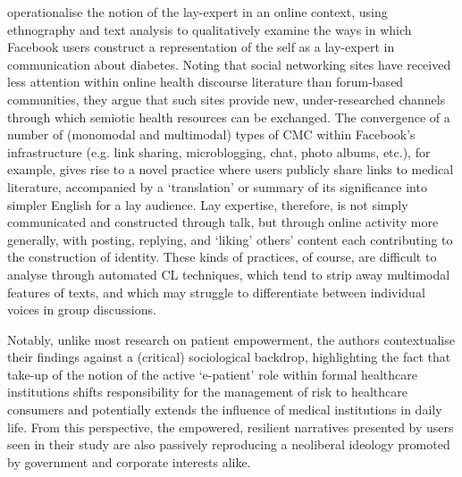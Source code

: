 
\textcite{koteyko2015performing} operationalise the notion of the lay\hyp{}expert in an online context, using ethnography and text analysis to qualitatively examine the ways in which Facebook users construct a representation of the self as a lay\hyp{}expert in communication about diabetes. Noting that social networking sites have received less attention within online health discourse literature than \gls{forum}\hyp{}based communities, they argue that such sites provide new, under\hyp{}researched channels through which semiotic health resources can be exchanged. The convergence of a number of (monomodal and multimodal) types of \gls{CMC} within Facebook's infrastructure (e.g. link sharing, microblogging, chat, photo albums, etc.), for example, gives rise to a novel practice where users publicly share links to medical literature, accompanied by a `translation' or summary of its significance into simpler English for a lay audience. Lay expertise, therefore, is not simply communicated and constructed through talk, but through online activity more generally, with posting, replying, and `liking' others' content each contributing to the construction of identity. These kinds of practices, of course, are difficult to analyse through automated \gls{CL} techniques, which tend to strip away multimodal features of texts, and which may struggle to differentiate between individual voices in group discussions. 

Notably, unlike most research on patient empowerment, the authors contextualise their findings against a (critical) sociological backdrop, highlighting the fact that take\hyp{}up of the notion of the active `e\hyp{}patient' role within formal healthcare institutions shifts responsibility for the management of risk to healthcare consumers and potentially extends the influence of medical institutions in daily life. From this perspective, the empowered, resilient narratives presented by users seen in their study are also passively reproducing a neoliberal ideology promoted by government and corporate interests alike.

